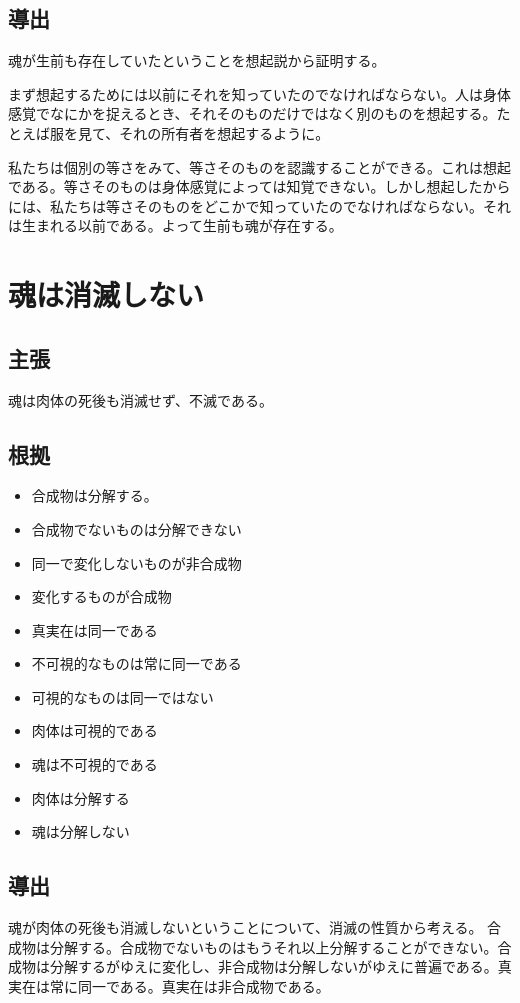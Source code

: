 \documentclass[a4j,11pt]{jarticle}
\begin{document}
\subsection{導出}

魂が生前も存在していたということを想起説から証明する。

まず想起するためには以前にそれを知っていたのでなければならない。人は身体感覚でなにかを捉えるとき、それそのものだけではなく別のものを想起する。たとえば服を見て、それの所有者を想起するように。

私たちは個別の等さをみて、等さそのものを認識することができる。これは想起である。等さそのものは身体感覚によっては知覚できない。しかし想起したからには、私たちは等さそのものをどこかで知っていたのでなければならない。それは生まれる以前である。よって生前も魂が存在する。

\section{魂は消滅しない}
\subsection{主張}
魂は肉体の死後も消滅せず、不滅である。

\subsection{根拠}    
\begin{itemize}
    \item 合成物は分解する。
    \item 合成物でないものは分解できない
    \item 同一で変化しないものが非合成物
    \item 変化するものが合成物
    \item 真実在は同一である
    \item 不可視的なものは常に同一である
    \item 可視的なものは同一ではない
    \item 肉体は可視的である
    \item 魂は不可視的である
    \item 肉体は分解する
    \item 魂は分解しない
\end{itemize}

\subsection{導出}
魂が肉体の死後も消滅しないということについて、消滅の性質から考える。
合成物は分解する。合成物でないものはもうそれ以上分解することができない。合成物は分解するがゆえに変化し、非合成物は分解しないがゆえに普遍である。真実在は常に同一である。真実在は非合成物である。
\end{document}
